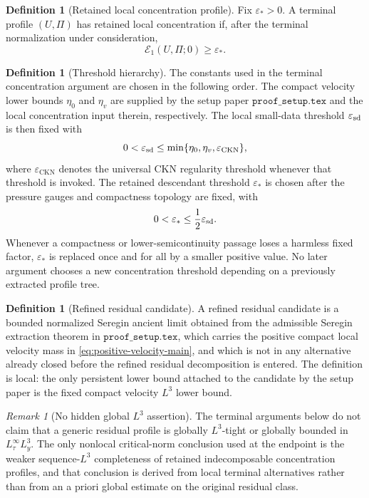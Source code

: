\documentclass[11pt]{amsart}
\numberwithin{equation}{section}
\theoremstyle{plain}
\theoremstyle{definition}
\newtheorem{definition}[theorem]{Definition}
\theoremstyle{remark}
\newtheorem{remark}[theorem]{Remark}
\newcommand{\eps}{\varepsilon}
\newcommand{\CKN}{\mathrm{CKN}}
\newcommand{\calE}{\mathcal E}
\begin{document}
\begin{definition}[Retained local concentration profile]
\label{def:retained-active-main}
Fix \(\eps_*>0\).  A terminal profile \((U,\Pi)\) has retained local
concentration if, after the terminal normalization under consideration,
\[
   \calE_1(U,\Pi;0)\ge \eps_* .
\]
\end{definition}

\begin{definition}[Threshold hierarchy]
\label{def:threshold-hierarchy}
The constants used in the terminal concentration argument are chosen in the following order.
The compact velocity lower bounds \(\eta_0\) and \(\eta_v\) are supplied by
the setup paper \(\texttt{proof\_setup.tex}\) and the local concentration input
therein, respectively.  The local small-data threshold
\(\eps_{\rm sd}\) is then fixed with
\[
   0<\eps_{\rm sd}\le \min\{\eta_0,\eta_v,\eps_{\CKN}\},
\]
where \(\eps_{\CKN}\) denotes the universal CKN regularity threshold whenever
that threshold is invoked.  The retained descendant threshold \(\eps_*\) is
chosen after the pressure gauges and compactness topology are fixed, with
\[
   0<\eps_*\le \frac12\eps_{\rm sd}.
\]
Whenever a compactness or lower-semicontinuity passage loses a harmless fixed
factor, \(\eps_*\) is replaced once and for all by a smaller positive value.
No later argument chooses a new concentration threshold depending on a
previously extracted profile tree.
\end{definition}

\begin{definition}[Refined residual candidate]
\label{def:refined-residual-candidate}
A refined residual candidate is a bounded normalized Seregin ancient limit
obtained from the admissible Seregin extraction theorem in
\(\texttt{proof\_setup.tex}\), which carries the positive compact local velocity
mass in \eqref{eq:positive-velocity-main}, and which is not in any alternative
already closed before the refined residual decomposition is entered.  The
definition is local: the only persistent lower bound attached to the candidate by
the setup paper is the fixed compact velocity \(L^3\) lower bound.
\end{definition}

\begin{remark}[No hidden global \(L^3\) assertion]
\label{rem:no-hidden-global-L3}
The terminal arguments below do not claim that a generic residual profile is
globally \(L^3\)-tight or globally bounded in \(L^\infty_\tau L^3_y\).  The
only nonlocal critical-norm conclusion used at the endpoint is the weaker
sequence-\(L^3\) completeness of retained indecomposable concentration
profiles, and that conclusion is derived from local terminal alternatives rather than from an
a priori global estimate on the original residual class.
\end{remark}
\end{document}
